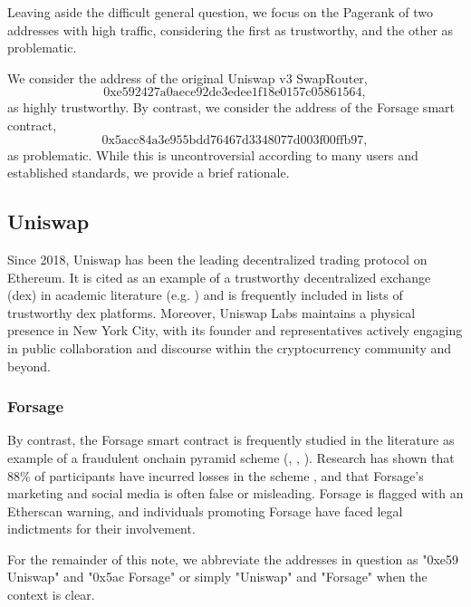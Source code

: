 \documentclass[a4paper]{article}
\begin{document}
Leaving aside the difficult general question, we focus on the Pagerank of two addresses with high traffic, considering the first as trustworthy, and the other as problematic.

We consider the address of the original Uniswap v3 SwapRouter, $$\textrm{0xe592427a0aece92de3edee1f18e0157c05861564},$$
as highly trustworthy.  By contrast, we consider the address of the Forsage smart contract, $$\textrm{0x5acc84a3e955bdd76467d3348077d003f00ffb97},$$
as problematic.  While this is uncontroversial according to many users and established standards, we provide a brief rationale. 

\subsection{Uniswap}

Since 2018, Uniswap has been the leading decentralized trading protocol on Ethereum.  It is cited as an example of a trustworthy decentralized exchange (dex) in academic literature (e.g. \cite{Uni1, Uni2}) and is frequently included in lists of trustworthy dex platforms.  Moreover, Uniswap Labs maintains a physical presence in New York City, with its founder and representatives actively engaging in public collaboration and discourse within the cryptocurrency community and beyond.

\subsubsection{Forsage}

By contrast, the Forsage smart contract is frequently studied in the literature as example of a fraudulent onchain pyramid scheme (\cite{Forsage}, \cite{Datasets}, \cite{Ponzi}).  Research  has shown that 88\% of participants have incurred losses in the scheme \cite{Forsage}, and that Forsage's marketing and social media  is often false or misleading.  Forsage is flagged with an Etherscan warning, and individuals promoting Forsage have faced legal indictments for their involvement.

\bigskip

For the remainder of this note, we abbreviate the addresses in question as "0xe59 Uniswap" and "0x5ac Forsage" or simply "Uniswap" and "Forsage" when the context is clear.
\end{document}
